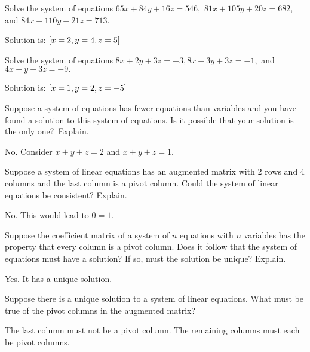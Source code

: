 \begin{enumialphparenastyle}
\begin{ex} Solve the system of equations
$65x+84y+16z=546,$ $81x+105y+20z=682,$ and $84x+110y+21z=713.$
\begin{sol}
Solution is:
$\left[x=2,y=4,z=5\right] $
\end{sol}
\end{ex}

\begin{ex} Solve the system of equations 
$8x+2y+3z=-3,8x+3y+3z=-1,$ and $4x+y+3z=-9.$
\begin{sol}
Solution is: $\left[x=1,y=2,z=-5\right] $
\end{sol}
\end{ex}

\begin{ex} Suppose a system of equations has fewer equations than variables and
you have found a solution to this system of equations. Is it possible that
your solution is the only one?\ Explain.
\begin{sol}
No. Consider $x+y+z=2$ and $x+y+z=1.$
\end{sol}
\end{ex}

\begin{ex} Suppose a system of linear equations has an augmented
  matrix with 2 rows and 4 columns and the last column is a pivot
  column. Could the system of linear equations be consistent? Explain.
  \begin{sol}
    No. This would lead to $0=1.$
  \end{sol}
\end{ex}

\begin{ex} Suppose the coefficient matrix of a system of $n$ equations with $n$
variables has the property that every column is a pivot column. Does it
follow that the system of equations must have a solution? If so, must the
solution be unique? Explain. 
\begin{sol}
Yes. It has a unique solution.
\end{sol}
\end{ex}

\begin{ex} Suppose there is a unique solution to a system of linear equations.
What must be true of the pivot columns in the augmented matrix?
\begin{sol}
The last column must not be a pivot column. The remaining columns must each be pivot
columns.
\end{sol}
\end{ex}



\end{enumialphparenastyle}
